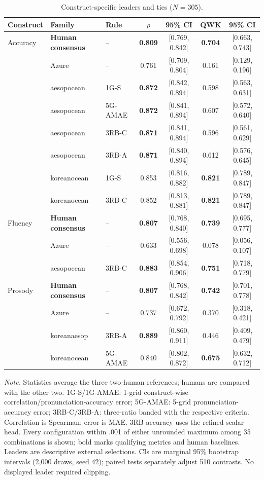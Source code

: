 \documentclass[cameraready]{Interspeech}
\begin{document}
\begin{table}[t]
\centering
\small
\setlength{\tabcolsep}{5pt}
\renewcommand{\arraystretch}{1.0}
\caption{Construct-specific leaders and ties ($N=305$).}
\label{tab:external}
\begin{tabular}{@{}lllcccc@{}}
\toprule
Construct & Family & Rule & $\rho$ & 95\% CI & QWK & 95\% CI\\
\midrule
Accuracy & \textbf{Human consensus} & -- & \textbf{0.809} & [0.769, 0.842] & \textbf{0.704} & [0.663, 0.743]\\
 & Azure & -- & 0.761 & [0.709, 0.804] & 0.161 & [0.129, 0.196]\\
 & aesopocean & 1G-S & \textbf{0.872} & [0.842, 0.894] & 0.598 & [0.563, 0.631]\\
 & aesopocean & 5G-AMAE & \textbf{0.872} & [0.841, 0.894] & 0.607 & [0.572, 0.640]\\
 & aesopocean & 3RB-C & \textbf{0.871} & [0.841, 0.894] & 0.596 & [0.561, 0.629]\\
 & aesopocean & 3RB-A & \textbf{0.871} & [0.840, 0.894] & 0.612 & [0.576, 0.645]\\
 & koreanocean & 1G-S & 0.853 & [0.816, 0.882] & \textbf{0.821} & [0.789, 0.847]\\
 & koreanocean & 3RB-C & 0.852 & [0.813, 0.881] & \textbf{0.821} & [0.789, 0.847]\\
\midrule
Fluency & \textbf{Human consensus} & -- & \textbf{0.807} & [0.768, 0.840] & \textbf{0.739} & [0.695, 0.777]\\
 & Azure & -- & 0.633 & [0.556, 0.698] & 0.078 & [0.056, 0.107]\\
 & aesopocean & 3RB-C & \textbf{0.883} & [0.854, 0.906] & \textbf{0.751} & [0.718, 0.779]\\
\midrule
Prosody & \textbf{Human consensus} & -- & \textbf{0.807} & [0.768, 0.842] & \textbf{0.742} & [0.701, 0.778]\\
 & Azure & -- & 0.737 & [0.672, 0.792] & 0.370 & [0.318, 0.421]\\
 & koreanaesop & 3RB-A & \textbf{0.889} & [0.860, 0.911] & 0.446 & [0.409, 0.479]\\
 & koreanocean & 5G-AMAE & 0.840 & [0.802, 0.872] & \textbf{0.675} & [0.632, 0.712]\\
\bottomrule
\end{tabular}
\par\smallskip
\begin{minipage}{\textwidth}
\footnotesize
\textit{Note.} Statistics average the three two-human references; humans are compared with the other two. 1G-S/1G-AMAE: 1-grid construct-wise correlation/pronunciation-accuracy error; 5G-AMAE: 5-grid pronunciation-accuracy error; 3RB-C/3RB-A: three-ratio banded with the respective criteria. Correlation is Spearman; error is MAE. 3RB accuracy uses the refined scalar head. Every configuration within .001 of either unrounded maximum among 35 combinations is shown; bold marks qualifying metrics and human baselines. Leaders are descriptive external selections. CIs are marginal 95\% bootstrap intervals (2,000 draws, seed 42); paired tests separately adjust 510 contrasts. No displayed leader required clipping.
\end{minipage}
\end{table}
\end{document}
